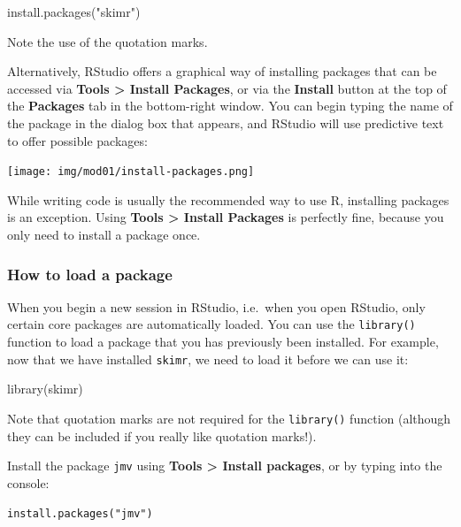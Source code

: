 \documentclass[
  a4paper,
]{memoir}
\newenvironment{Shaded}{\begin{snugshade}}{\end{snugshade}}
\newcommand{\FunctionTok}[1]{\textcolor[rgb]{0.00,0.00,0.00}{#1}}
\newcommand{\NormalTok}[1]{\textcolor[rgb]{0.00,0.00,0.00}{#1}}
\newcommand{\StringTok}[1]{\textcolor[rgb]{0.00,0.00,0.00}{#1}}
\begin{document}
\begin{Shaded}
\begin{Highlighting}[]
\FunctionTok{install.packages}\NormalTok{(}\StringTok{"skimr"}\NormalTok{)}
\end{Highlighting}
\end{Shaded}

Note the use of the quotation marks.

Alternatively, RStudio offers a graphical way of installing packages
that can be accessed via \textbf{Tools \textgreater{} Install Packages},
or via the \textbf{Install} button at the top of the \textbf{Packages}
tab in the bottom-right window. You can begin typing the name of the
package in the dialog box that appears, and RStudio will use predictive
text to offer possible packages:

\texttt{[image: img/mod01/install-packages.png]}

While writing code is usually the recommended way to use R, installing
packages is an exception. Using \textbf{Tools \textgreater{} Install
Packages} is perfectly fine, because you only need to install a package
once.

\hypertarget{how-to-load-a-package}{%
\subsubsection{How to load a package}\label{how-to-load-a-package}}

When you begin a new session in RStudio, i.e.~when you open RStudio,
only certain core packages are automatically loaded. You can use the
\texttt{library()} function to load a package that you has previously
been installed. For example, now that we have installed \texttt{skimr},
we need to load it before we can use it:

\begin{Shaded}
\begin{Highlighting}[]
\FunctionTok{library}\NormalTok{(skimr)}
\end{Highlighting}
\end{Shaded}

Note that quotation marks are not required for the \texttt{library()}
function (although they can be included if you really like quotation
marks!).

\begin{tcolorbox}[enhanced jigsaw, title={TASK}, opacitybacktitle=0.6, colbacktitle=quarto-callout-note-color!10!white, titlerule=0mm, colframe=quarto-callout-note-color-frame, opacityback=0, left=2mm, breakable, bottomtitle=1mm, coltitle=black, bottomrule=.15mm, arc=.35mm, rightrule=.15mm, toptitle=1mm, colback=white, toprule=.15mm, leftrule=.75mm]

Install the package \texttt{jmv} using \textbf{Tools \textgreater{}
Install packages}, or by typing into the console:

\texttt{install.packages("jmv")}

\end{tcolorbox}
\end{document}

